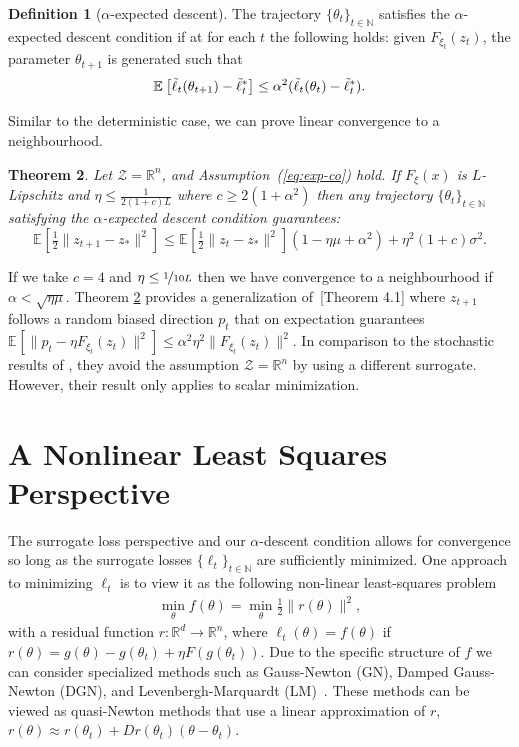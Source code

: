 \documentclass{article} %
\newtheorem{theorem}{Theorem}[section]
\theoremstyle{definition}
\newtheorem{definition}[theorem]{Definition}
\newcommand{\reals}{\mathbb{R}}
\newcommand{\nnumbers}{\mathbb{N}}
\newcommand{\expect}[2][]{\mathbb{E}_{#1}\left[ #2\right]}
\begin{document}
\begin{definition}[$\alpha$-expected descent]\label{eq:exp-bias}
The trajectory $\{\theta_t\}_{t\in \nnumbers}$ satisfies the $\alpha$-expected descent condition if at for each $t$ the following holds:
given $F_{\xi_t}(z_t)$,
the parameter $\theta_{t+1}$ is generated such that 
\[
\expect{\Tilde{\ell}_t(\theta_{t+1})-\Tilde{\ell}_t^\ast} \leq \alpha^2(\Tilde{\ell}_t(\theta_{t})-\Tilde{\ell}_t^\ast).
\]
\end{definition}
Similar to the deterministic case, we can prove linear convergence to a neighbourhood.
\begin{theorem}\label{thm:stochastic}
Let $\mathcal{Z} = \reals^n$, and Assumption~(\ref{eq:exp-co}) hold.  
If $F_{\xi}(x)$  is $L$-Lipschitz and $\eta \leq \frac{1}{2(1+c)L}$ where  $c \geq  2(1+\alpha^2)$  then any trajectory $\{\theta_t\}_{t\in \nnumbers}$ 
satisfying the $\alpha$-expected descent condition guarantees:
\[
\expect{\tfrac{1}{2}\|z_{t+1}-z_\ast\|^2} \leq \expect{\tfrac{1}{2}\|z_{t}-z_\ast\|^2}\left(1-\eta\mu + \alpha^2\right) +\eta^2(1+c)\sigma^2. 
\]
\end{theorem}
 If we take $c=4$ and $\eta\leq \nicefrac{1}{10 L}$ then we have convergence to a neighbourhood if $\alpha < \sqrt{\eta \mu}$.
 Theorem \ref{thm:stochastic} provides a generalization of~\citet{loizou2021stochastic}[Theorem 4.1] where $z_{t+1}$ follows a random biased direction $p_t$ that on expectation guarantees $\expect{\|p_t -\eta F_{\xi_t}(z_t)\|^2} \leq \alpha^2 \eta^2 \|F_{\xi_t}(z_t)\|^2$.
 In comparison to the stochastic results of \citet{lavington2023target}, they avoid the assumption $\mathcal{Z} = \reals^n$ by using a different surrogate. However, their result only applies to scalar minimization.

 
 \section{A Nonlinear Least Squares Perspective}\label{sec:non-linear}
The surrogate loss perspective and our $\alpha$-descent condition allows for convergence so long as the surrogate losses $\{\ell_t\}_{t\in \nnumbers}$ are sufficiently minimized.
One approach to minimizing $\ell_t$ is to view it as the following  non-linear least-squares problem 
\begin{align}
\min_\theta f(\theta) = \min_\theta \frac{1}{2}\|r(\theta)\|^2,
\end{align}
with a residual function $r: \reals^d \to \reals^n$,
where $\ell_t(\theta)= f(\theta)$ if $r(\theta) = g(\theta)-g(\theta_t)+\eta F(g(\theta_t))$.
Due to the specific structure of $f$ we can consider  specialized methods such as Gauss-Newton (GN), Damped Gauss-Newton (DGN), and Levenbergh-Marquardt (LM)~\citep{bjorck1996numerical,nocedal1999numerical}.
These methods can be viewed as quasi-Newton methods that use a linear approximation of $r$, $r(\theta) \approx r(\theta_t) + Dr(\theta_t)(\theta -\theta_t)$. 
\end{document}
